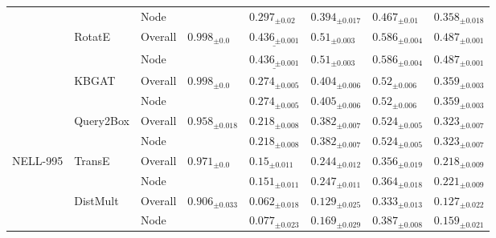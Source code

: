 \begin{table}[!ht]
\begin{adjustbox}{width=\textwidth}
\begin{tabular}{llllllll}
         &           & Node &                          &             ${{0.297}_{\pm 0.02}}$ &            ${{0.394}_{\pm 0.017}}$ &             ${{0.467}_{\pm 0.01}}$ &            ${{0.358}_{\pm 0.018}}$ \\
         & RotatE & Overall &    ${{0.998}_{\pm 0.0}}$ &  $\underline{{0.436}_{\pm 0.001}}$ &      $\mathbf{{0.51}_{\pm 0.003}}$ &     $\mathbf{{0.586}_{\pm 0.004}}$ &     $\mathbf{{0.487}_{\pm 0.001}}$ \\
         &           & Node &                          &  $\underline{{0.436}_{\pm 0.001}}$ &      $\mathbf{{0.51}_{\pm 0.003}}$ &     $\mathbf{{0.586}_{\pm 0.004}}$ &     $\mathbf{{0.487}_{\pm 0.001}}$ \\
         & KBGAT & Overall &    ${{0.998}_{\pm 0.0}}$ &            ${{0.274}_{\pm 0.005}}$ &            ${{0.404}_{\pm 0.006}}$ &             ${{0.52}_{\pm 0.006}}$ &            ${{0.359}_{\pm 0.003}}$ \\
         &           & Node &                          &            ${{0.274}_{\pm 0.005}}$ &            ${{0.405}_{\pm 0.006}}$ &             ${{0.52}_{\pm 0.006}}$ &            ${{0.359}_{\pm 0.003}}$ \\
         & Query2Box & Overall &  ${{0.958}_{\pm 0.018}}$ &     $\mathbf{{0.218}_{\pm 0.008}}$ &     $\mathbf{{0.382}_{\pm 0.007}}$ &     $\mathbf{{0.524}_{\pm 0.005}}$ &     $\mathbf{{0.323}_{\pm 0.007}}$ \\
         &           & Node &                          &     $\mathbf{{0.218}_{\pm 0.008}}$ &     $\mathbf{{0.382}_{\pm 0.007}}$ &     $\mathbf{{0.524}_{\pm 0.005}}$ &     $\mathbf{{0.323}_{\pm 0.007}}$ \\
\midrule
NELL-995 & TransE & Overall &    ${{0.971}_{\pm 0.0}}$ &             ${{0.15}_{\pm 0.011}}$ &            ${{0.244}_{\pm 0.012}}$ &            ${{0.356}_{\pm 0.019}}$ &            ${{0.218}_{\pm 0.009}}$ \\
         &           & Node &                          &            ${{0.151}_{\pm 0.011}}$ &            ${{0.247}_{\pm 0.011}}$ &            ${{0.364}_{\pm 0.018}}$ &            ${{0.221}_{\pm 0.009}}$ \\
         & DistMult & Overall &  ${{0.906}_{\pm 0.033}}$ &            ${{0.062}_{\pm 0.018}}$ &            ${{0.129}_{\pm 0.025}}$ &            ${{0.333}_{\pm 0.013}}$ &            ${{0.127}_{\pm 0.022}}$ \\
         &           & Node &                          &            ${{0.077}_{\pm 0.023}}$ &            ${{0.169}_{\pm 0.029}}$ &            ${{0.387}_{\pm 0.008}}$ &            ${{0.159}_{\pm 0.021}}$ \\

\end{tabular}
\end{adjustbox}
\end{table}
